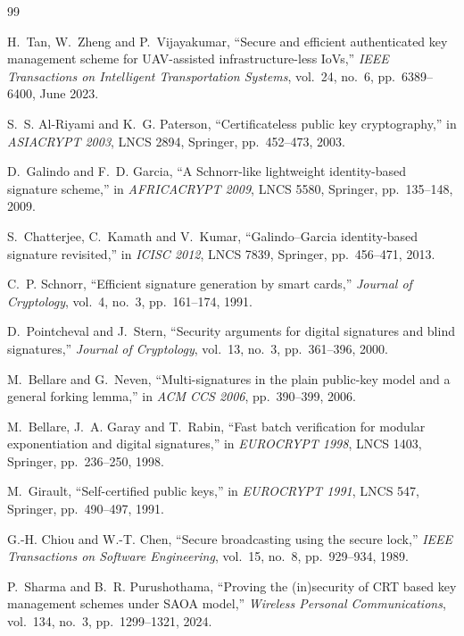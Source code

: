 \begin{thebibliography}{99}
\small

 H.~Tan, W.~Zheng and P.~Vijayakumar, ``Secure and efficient authenticated key management scheme for UAV-assisted infrastructure-less
IoVs,'' \emph{IEEE Transactions on Intelligent Transportation Systems}, vol.~24, no.~6, pp.~6389--6400, June 2023.

 S.~S. Al-Riyami and K.~G. Paterson, ``Certificateless public key cryptography,'' in \emph{ASIACRYPT 2003}, LNCS 2894, Springer,
pp.~452--473, 2003.

 D.~Galindo and F.~D. Garcia, ``A Schnorr-like lightweight identity-based signature scheme,'' in \emph{AFRICACRYPT 2009}, LNCS 5580,
Springer, pp.~135--148, 2009.

 S.~Chatterjee, C.~Kamath and V.~Kumar, ``Galindo--Garcia identity-based signature revisited,'' in \emph{ICISC 2012}, LNCS 7839,
Springer, pp.~456--471, 2013.

 C.~P. Schnorr, ``Efficient signature generation by smart cards,'' \emph{Journal of Cryptology}, vol.~4, no.~3, pp.~161--174, 1991.

 D.~Pointcheval and J.~Stern, ``Security arguments for digital signatures and blind signatures,'' \emph{Journal of Cryptology},
vol.~13, no.~3, pp.~361--396, 2000.

 M.~Bellare and G.~Neven, ``Multi-signatures in the plain public-key model and a general forking lemma,'' in \emph{ACM CCS 2006},
pp.~390--399, 2006.

 M.~Bellare, J.~A. Garay and T.~Rabin, ``Fast batch verification for modular exponentiation and digital signatures,'' in
\emph{EUROCRYPT 1998}, LNCS 1403, Springer, pp.~236--250, 1998.

 M.~Girault, ``Self-certified public keys,'' in \emph{EUROCRYPT 1991}, LNCS 547, Springer, pp.~490--497, 1991.

 G.-H. Chiou and W.-T. Chen, ``Secure broadcasting using the secure lock,'' \emph{IEEE Transactions on Software Engineering},
vol.~15, no.~8, pp.~929--934, 1989.

 P.~Sharma and B.~R. Purushothama, ``Proving the (in)security of CRT based key management schemes under SAOA model,''
\emph{Wireless Personal Communications}, vol.~134, no.~3, pp.~1299--1321, 2024.


\end{thebibliography}

